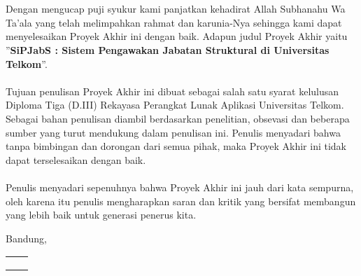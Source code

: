\chapter*{\kataPengantar}
\noindent
Dengan mengucap puji syukur kami panjatkan kehadirat Allah Subhanahu Wa Ta’ala yang telah melimpahkan rahmat dan karunia-Nya sehingga kami dapat menyelesaikan Proyek Akhir ini dengan baik. Adapun judul Proyek Akhir yaitu ”\textbf{SiPJabS : Sistem Pengawakan Jabatan Struktural di Universitas Telkom}”. 
\\
\\
Tujuan penulisan Proyek Akhir ini dibuat sebagai salah satu syarat kelulusan Diploma Tiga (D.III) Rekayasa Perangkat Lunak Aplikasi Universitas Telkom. Sebagai bahan penulisan diambil berdasarkan penelitian, obsevasi dan beberapa sumber yang turut mendukung dalam penulisan ini. Penulis menyadari bahwa tanpa bimbingan dan dorongan dari semua pihak, maka Proyek Akhir ini tidak dapat terselesaikan dengan baik. 
\\
\\
Penulis menyadari sepenuhnya bahwa Proyek Akhir ini jauh dari kata sempurna, oleh karena itu penulis mengharapkan saran dan kritik yang bersifat membangun yang lebih baik untuk generasi penerus kita.
 
\vspace*{0.1cm}
\begin{flushright}
Bandung, \tanggalPengesahan\\

 \begin{tabular}{ll} \\ [0.5 cm]
 	 \\ [0.5 cm]
	\penulistu 	& \penulisdu \\
	\nimtu 		& \nimdu \\
\end{tabular}


\end{flushright}